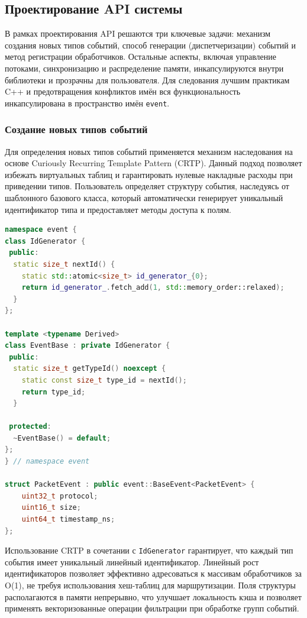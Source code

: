 \subsection{Проектирование API системы}
В рамках проектирования API решаются три ключевые задачи: механизм создания новых типов событий, способ генерации (диспетчеризации) событий и метод регистрации обработчиков.
Остальные аспекты, включая управление потоками, синхронизацию и распределение памяти, инкапсулируются внутри библиотеки и прозрачны для пользователя.
Для следования лучшим практикам C++ и предотвращения конфликтов имён вся функциональность инкапсулирована в пространство имён \texttt{event}.

\subsubsection{Создание новых типов событий}
Для определения новых типов событий применяется механизм наследования на основе Curiously Recurring Template Pattern (CRTP).
Данный подход позволяет избежать виртуальных таблиц и гарантировать нулевые накладные расходы при приведении типов.
Пользователь определяет структуру события, наследуясь от шаблонного базового класса, который автоматически генерирует уникальный идентификатор типа и предоставляет методы доступа к полям.

\begin{lstlisting}[language=C++, caption={Определение пользовательского типа события}]
namespace event {
class IdGenerator {
 public:
  static size_t nextId() {
    static std::atomic<size_t> id_generator_{0};
    return id_generator_.fetch_add(1, std::memory_order::relaxed);
  }
};

template <typename Derived>
class EventBase : private IdGenerator {
 public:
  static size_t getTypeId() noexcept {
    static const size_t type_id = nextId();
    return type_id;
  }

 protected:
  ~EventBase() = default;
};
} // namespace event

struct PacketEvent : public event::BaseEvent<PacketEvent> {
    uint32_t protocol;
    uint16_t size;
    uint64_t timestamp_ns;
};
\end{lstlisting}

Использование CRTP в сочетании с \texttt{IdGenerator} гарантирует, что каждый тип события имеет уникальный линейный идентификатор.
Линейный рост идентификаторов позволяет эффективно адресоваться к массивам обработчиков за O(1), не требуя использования хеш-таблиц для маршрутизации.
Поля структуры располагаются в памяти непрерывно, что улучшает локальность кэша и позволяет применять векторизованные операции фильтрации при обработке групп событий.

